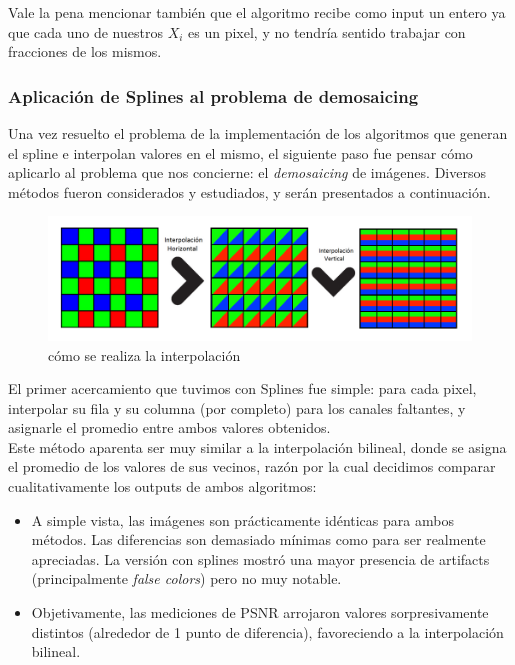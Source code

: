 \documentclass[a4paper]{article}
\begin{document}
Vale la pena mencionar también que el algoritmo recibe como input un entero ya que cada uno de nuestros $X_i$ es un pixel, y no tendría sentido trabajar con fracciones de los mismos. \\

\subsubsection*{Aplicación de Splines al problema de demosaicing}

Una vez resuelto el problema de la implementación de los algoritmos que generan el spline e interpolan valores en el mismo, el siguiente paso fue pensar c\'omo aplicarlo al problema que nos concierne: el \textit{demosaicing} de imágenes. Diversos métodos fueron considerados y estudiados, y serán presentados a continuación. \\
\pagebreak
\begin{figure}[h!]
	\caption{cómo se realiza la interpolación}
	\begin{center}
	    \includegraphics[scale=0.47]{imagenes/Splines/splines1.png}
	\end{center}
	\label{splines1}
\end{figure}

El primer acercamiento que tuvimos con Splines fue simple: para cada pixel, interpolar su fila y su columna (por completo) para los canales faltantes, y asignarle el promedio entre ambos valores obtenidos. \\
Este método aparenta ser muy similar a la interpolación bilineal, donde se asigna el promedio de los valores de sus vecinos, razón por la cual decidimos comparar cualitativamente los outputs de ambos algoritmos:
\begin{itemize}
\item A simple vista, las imágenes son prácticamente idénticas para ambos métodos. Las diferencias son demasiado mínimas como para ser realmente apreciadas. La versión con splines mostró una mayor presencia de artifacts (principalmente \textit{false colors}) pero no muy notable.
\item Objetivamente, las mediciones de PSNR arrojaron valores sorpresivamente distintos (alrededor de 1 punto de diferencia), favoreciendo a la interpolación bilineal.
\end{itemize}
\end{document}
